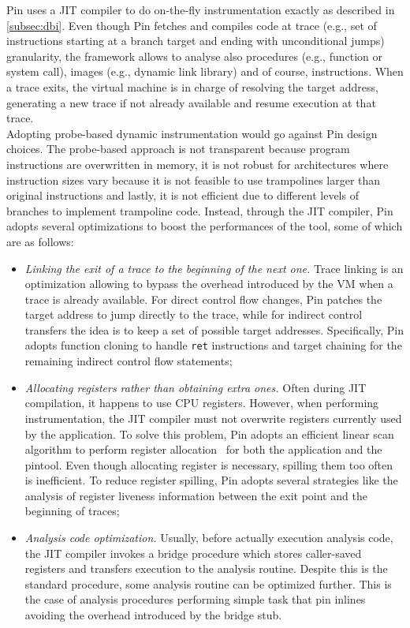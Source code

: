 \documentclass[LaM,binding=0.6cm]{sapthesis}
\begin{document}
Pin uses a JIT compiler to do on-the-fly instrumentation exactly as described in \autoref{subsec:dbi}. Even though Pin fetches and compiles code at trace (e.g., set of instructions starting at a branch target and ending with unconditional jumps) granularity, the framework allows to analyse also procedures (e.g., function or system call), images (e.g., dynamic link library) and of course, instructions. When a trace exits, the virtual machine is in charge of resolving the target address, generating a new trace if not already available and resume execution at that trace.\\
Adopting probe-based dynamic instrumentation would go against Pin design choices. The probe-based approach is not transparent because program instructions are overwritten in memory, it is not robust for architectures where instruction sizes vary because it is not feasible to use trampolines larger than original instructions and lastly, it is not efficient due to different levels of branches to implement trampoline code. Instead, through the JIT compiler, Pin adopts several optimizations to boost the performances of the tool, some of which are as follows:
\begin{itemize}
\item {\em Linking the exit of a trace to the beginning of the next one.} Trace linking is an optimization allowing to bypass the overhead introduced by the VM when a trace is already available. For direct control flow changes, Pin patches the target address to jump directly to the trace, while for indirect control transfers the idea is to keep a set of possible target addresses. Specifically, Pin adopts function cloning to handle \texttt{ret} instructions and target chaining for the remaining indirect control flow statements;
\item {\em Allocating registers rather than obtaining extra ones.} Often during JIT compilation, it happens to use CPU registers. However, when performing instrumentation, the JIT compiler must not overwrite registers currently used by the application. To solve this problem, Pin adopts an efficient linear scan algorithm to perform register allocation~\cite{poletto1999linear} for both the application and the pintool. Even though allocating register is necessary, spilling them too often is inefficient. To reduce register spilling, Pin adopts several strategies like the analysis of register liveness information between the exit point and the beginning of traces;
\item {\em Analysis code optimization.} Usually, before actually execution analysis code, the JIT compiler invokes a bridge procedure which stores caller-saved registers and transfers execution to the analysis routine. Despite this is the standard procedure, some analysis routine can be optimized further. This is the case of analysis procedures performing simple task that pin inlines avoiding the overhead introduced by the bridge stub.
\end{itemize}
\end{document}
